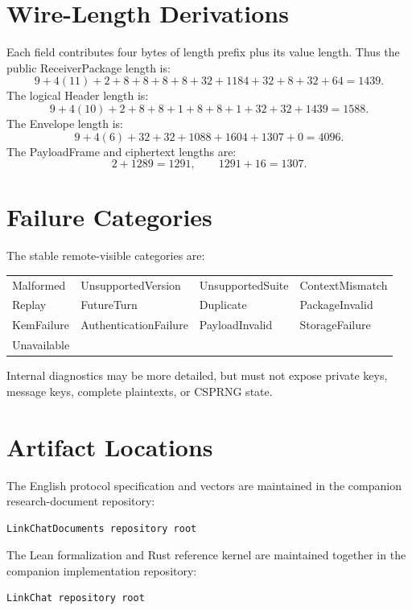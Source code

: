 \documentclass[11pt,letterpaper]{article}
\begin{document}
\appendix

\section{Wire-Length Derivations}
\label{app:lengths}

Each field contributes four bytes of length prefix plus its value length. Thus the public
ReceiverPackage length is:
\[
  9 + 4(11) + 2+8+8+8+8+32+1184+32+8+32+64 = 1439.
\]
The logical Header length is:
\[
  9+4(10)+2+8+8+1+8+8+1+32+32+1439=1588.
\]
The Envelope length is:
\[
  9+4(6)+32+32+1088+1604+1307+0=4096.
\]
The PayloadFrame and ciphertext lengths are:
\[
  2+1289=1291,\qquad 1291+16=1307.
\]

\section{Failure Categories}
\label{app:errors}

The stable remote-visible categories are:
\begin{center}
\begin{tabular}{llll}
\toprule
Malformed & UnsupportedVersion & UnsupportedSuite & ContextMismatch \\
Replay & FutureTurn & Duplicate & PackageInvalid \\
KemFailure & AuthenticationFailure & PayloadInvalid & StorageFailure \\
Unavailable & & & \\
\bottomrule
\end{tabular}
\end{center}
Internal diagnostics may be more detailed, but must not expose private keys, message keys,
complete plaintexts, or CSPRNG state.

\section{Artifact Locations}
\label{app:artifacts}

The English protocol specification and vectors are maintained in the companion
research-document repository:
\begin{lstlisting}
LinkChatDocuments repository root
\end{lstlisting}
The Lean formalization and Rust reference kernel are maintained together in
the companion implementation repository:
\begin{lstlisting}
LinkChat repository root
\end{lstlisting}
\end{document}
